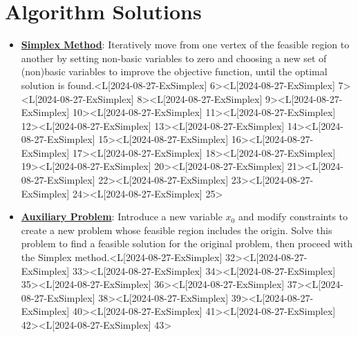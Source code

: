 \documentclass{article}%
\begin{document}
%
\section{Algorithm Solutions}%
\label{sec:AlgorithmSolutions}%
\begin{itemize}[[leftmargin=*]]%
\item \href{https://www.math.purdue.edu/~yipn/421/2024-08-27-ExSimplex.pdf#page=6}{\textbf{Simplex Method}}: Iteratively move from one vertex of the feasible region to another by setting non-basic variables to zero and choosing a new set of (non)basic variables to improve the objective function, until the optimal solution is found.<L[2024-08-27-ExSimplex] 6><L[2024-08-27-ExSimplex] 7><L[2024-08-27-ExSimplex] 8><L[2024-08-27-ExSimplex] 9><L[2024-08-27-ExSimplex] 10><L[2024-08-27-ExSimplex] 11><L[2024-08-27-ExSimplex] 12><L[2024-08-27-ExSimplex] 13><L[2024-08-27-ExSimplex] 14><L[2024-08-27-ExSimplex] 15><L[2024-08-27-ExSimplex] 16><L[2024-08-27-ExSimplex] 17><L[2024-08-27-ExSimplex] 18><L[2024-08-27-ExSimplex] 19><L[2024-08-27-ExSimplex] 20><L[2024-08-27-ExSimplex] 21><L[2024-08-27-ExSimplex] 22><L[2024-08-27-ExSimplex] 23><L[2024-08-27-ExSimplex] 24><L[2024-08-27-ExSimplex] 25>%
\item \href{https://www.math.purdue.edu/~yipn/421/2024-08-27-ExSimplex.pdf#page=32}{\textbf{Auxiliary Problem}}: Introduce a new variable  $x_0$ and modify constraints to create a new problem whose feasible region includes the origin. Solve this problem to find a feasible solution for the original problem, then proceed with the Simplex method.<L[2024-08-27-ExSimplex] 32><L[2024-08-27-ExSimplex] 33><L[2024-08-27-ExSimplex] 34><L[2024-08-27-ExSimplex] 35><L[2024-08-27-ExSimplex] 36><L[2024-08-27-ExSimplex] 37><L[2024-08-27-ExSimplex] 38><L[2024-08-27-ExSimplex] 39><L[2024-08-27-ExSimplex] 40><L[2024-08-27-ExSimplex] 41><L[2024-08-27-ExSimplex] 42><L[2024-08-27-ExSimplex] 43>%
\end{itemize}%
\end{document}
